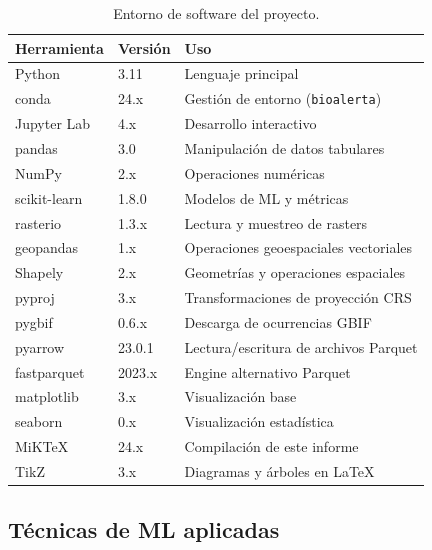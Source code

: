 \documentclass[12pt,a4paper]{article}
\begin{document}
\begin{table}[H]
  \centering\small
  \caption{Entorno de software del proyecto.}
  \label{tab:tools}
  \begin{tabular}{lll}
    \toprule
    \textbf{Herramienta} & \textbf{Versión} & \textbf{Uso} \\
    \midrule
    Python          & 3.11      & Lenguaje principal \\
    conda           & 24.x      & Gestión de entorno (\texttt{bioalerta}) \\
    Jupyter Lab     & 4.x       & Desarrollo interactivo \\
    \midrule
    pandas          & 3.0       & Manipulación de datos tabulares \\
    NumPy           & 2.x       & Operaciones numéricas \\
    scikit-learn    & 1.8.0     & Modelos de ML y métricas \\
    \midrule
    rasterio        & 1.3.x     & Lectura y muestreo de rasters \\
    geopandas       & 1.x       & Operaciones geoespaciales vectoriales \\
    Shapely         & 2.x       & Geometrías y operaciones espaciales \\
    pyproj          & 3.x       & Transformaciones de proyección CRS \\
    \midrule
    pygbif          & 0.6.x     & Descarga de ocurrencias GBIF \\
    pyarrow         & 23.0.1    & Lectura/escritura de archivos Parquet \\
    fastparquet     & 2023.x    & Engine alternativo Parquet \\
    \midrule
    matplotlib      & 3.x       & Visualización base \\
    seaborn         & 0.x       & Visualización estadística \\
    \midrule
    MiKTeX          & 24.x      & Compilación de este informe \\
    TikZ            & 3.x       & Diagramas y árboles en LaTeX \\
    \bottomrule
  \end{tabular}
\end{table}

\subsection{Técnicas de ML aplicadas}
\end{document}
